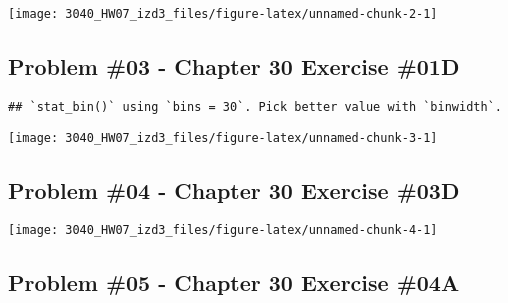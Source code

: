 \documentclass[
]{article}
\newenvironment{Shaded}{\begin{snugshade}}{\end{snugshade}}
\newcommand{\CommentTok}[1]{\textcolor[rgb]{0.56,0.35,0.01}{\textit{#1}}}
\newcommand{\FloatTok}[1]{\textcolor[rgb]{0.00,0.00,0.81}{#1}}
\newcommand{\FunctionTok}[1]{\textcolor[rgb]{0.13,0.29,0.53}{\textbf{#1}}}
\newcommand{\NormalTok}[1]{#1}
\newcommand{\SpecialCharTok}[1]{\textcolor[rgb]{0.81,0.36,0.00}{\textbf{#1}}}
\begin{document}
\texttt{[image: 3040\_HW07\_izd3\_files/figure-latex/unnamed-chunk-2-1]}

\newpage

\hypertarget{problem-03---chapter-30-exercise-01d}{%
\subsection{Problem \#03 - Chapter 30 Exercise
\#01D}\label{problem-03---chapter-30-exercise-01d}}

\begin{Shaded}
\end{Shaded}

\begin{verbatim}
## `stat_bin()` using `bins = 30`. Pick better value with `binwidth`.
\end{verbatim}

\texttt{[image: 3040\_HW07\_izd3\_files/figure-latex/unnamed-chunk-3-1]}

\newpage

\hypertarget{problem-04---chapter-30-exercise-03d}{%
\subsection{Problem \#04 - Chapter 30 Exercise
\#03D}\label{problem-04---chapter-30-exercise-03d}}

\begin{Shaded}
\end{Shaded}

\texttt{[image: 3040\_HW07\_izd3\_files/figure-latex/unnamed-chunk-4-1]}

\newpage

\hypertarget{problem-05---chapter-30-exercise-04a}{%
\subsection{Problem \#05 - Chapter 30 Exercise
\#04A}\label{problem-05---chapter-30-exercise-04a}}
\end{document}
